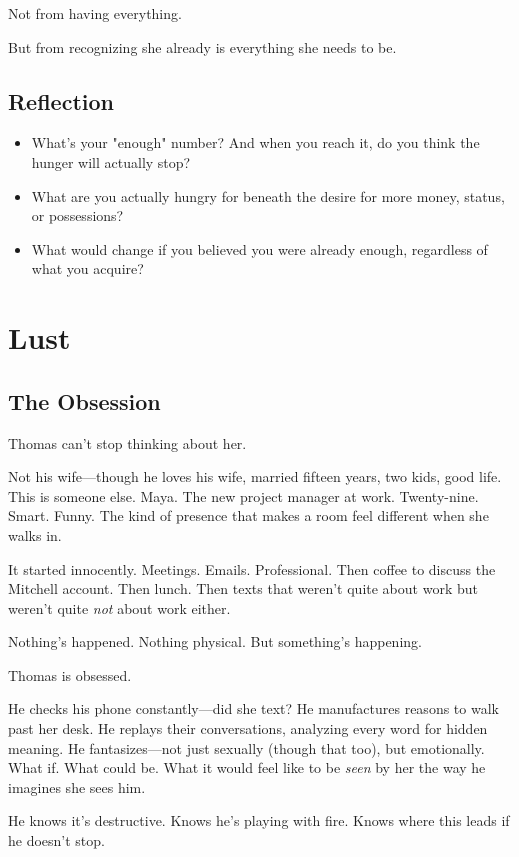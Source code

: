 \documentclass[11pt,twoside]{book}
\begin{document}
Not from having everything.

But from recognizing she already is everything she needs to be.

\section*{Reflection}

\begin{itemize}
\item What's your "enough" number? And when you reach it, do you think the hunger will actually stop?
\item What are you actually hungry for beneath the desire for more money, status, or possessions?
\item What would change if you believed you were already enough, regardless of what you acquire?
\end{itemize}

\chapter{Lust}

\section*{The Obsession}

Thomas can't stop thinking about her.

Not his wife—though he loves his wife, married fifteen years, two kids, good life. This is someone else. Maya. The new project manager at work. Twenty-nine. Smart. Funny. The kind of presence that makes a room feel different when she walks in.

It started innocently. Meetings. Emails. Professional. Then coffee to discuss the Mitchell account. Then lunch. Then texts that weren't quite about work but weren't quite \emph{not} about work either.

Nothing's happened. Nothing physical. But something's happening.

Thomas is obsessed.

He checks his phone constantly—did she text? He manufactures reasons to walk past her desk. He replays their conversations, analyzing every word for hidden meaning. He fantasizes—not just sexually (though that too), but emotionally. What if. What could be. What it would feel like to be \emph{seen} by her the way he imagines she sees him.

He knows it's destructive. Knows he's playing with fire. Knows where this leads if he doesn't stop.
\end{document}
